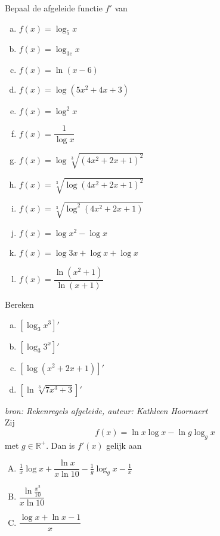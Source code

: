 \documentclass[12pt]{article}
\begin{document}
\begin{oefening}
Bepaal de afgeleide functie $f'$ van
\begin{multicols}{2}
\begin{enumerate}[(a)]
  \itemsep0.5em
  \item $\displaystyle f(x)=\log_5 x$
  \item $\displaystyle f(x)=\log_{3e} x$
  \item $\displaystyle f(x)=\ln(x-6)$
  \item $\displaystyle f(x)=\log(5x^2+4x+3)$
  \item $\displaystyle f(x)=\log^2 x$
  \item $\displaystyle f(x)=\dfrac{1}{\log x}$
  \item $\displaystyle f(x)=\log \sqrt[3]{\left(4x^2+2x+1\right)^2}$
  \item $\displaystyle f(x)=\sqrt[3]{\log\left(4x^2+2x+1\right)^2}$
  \item $\displaystyle f(x)=\sqrt[3]{\log^2(4x^2+2x+1)}$
  \item $\displaystyle f(x)=\log x^2 - \log x$
  \item $\displaystyle f(x)=\log 3x + \log x + \log x$
  \item $\displaystyle f(x)=\dfrac{\ln(x^2+1)}{\ln(x+1)}$
\end{enumerate}
\end{multicols}
\end{oefening}

\begin{oefening}
Bereken
\begin{enumerate}[(a)]
  \itemsep.7em
  \item $\displaystyle \left[\log_3 x^3\right]'$
  \item $\displaystyle \left[\log_3 3^x\right]'$
  \item $\displaystyle \left[\log \left(x^2+2x+1\right)\right]'$
  \item $\displaystyle \left[\ln \sqrt[3]{7x^3+3}\right]'$
\end{enumerate}
\end{oefening}

\begin{oefening}
{\em \scriptsize bron: Rekenregels afgeleide, auteur: Kathleen Hoornaert}\\
Zij
$$f(x)=\ln x \log x - \ln g \log_g x$$
met $g\in \mathbb{R}^+$. Dan is $f'(x)$ gelijk aan
\begin{enumerate}[(A)]
  \itemsep.8em
  \item $\frac{1}{x} \log x + \dfrac{\ln x}{x \ln 10} - \frac{1}{g}\log_g x - \frac{1}{x}$
  \item $\dfrac{\ln \frac{x^2}{10}}{x \ln 10}$
  \item $\dfrac{\log x + \ln x - 1}{x}$
\end{enumerate}
\end{oefening}
\end{document}
